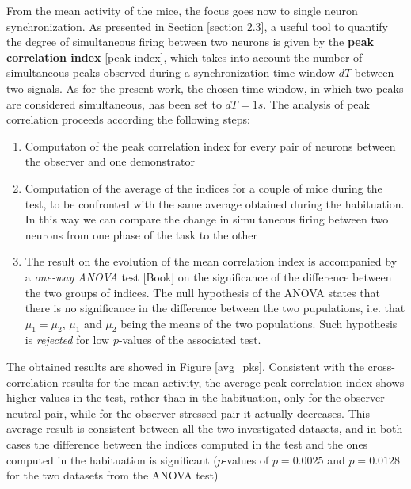 \documentclass[12pt, a4paper]{article}
\begin{document}
From the mean activity of the mice, the focus goes now to single neuron synchronization. As presented in Section \ref{section 2.3}, a useful tool to quantify the degree of simultaneous firing between two neurons is given by the \textbf{peak correlation index} \ref{peak index}, which takes into account the number of simultaneous peaks observed during a synchronization time window $dT$ between two signals. As for the present work, the chosen time window, in which two peaks are considered simultaneous, has been set to $dT = 1 s$. The analysis of peak correlation proceeds according the following steps:

\begin{enumerate}
	
	\item Computaton of the peak correlation index for every pair of neurons between the observer and one demonstrator 
	
	\item Computation of the average of the indices for a couple of mice during the test, to be confronted with the same average obtained during the habituation. In this way we can compare the change in simultaneous firing between two neurons from one phase of the task to the other
	
	\item The result on the evolution of the mean correlation index is accompanied by a \textit{one-way ANOVA} test [Book] on the significance of the difference between the two groups of indices. The null hypothesis of the ANOVA states that there is no significance in the difference between the two pupulations, i.e. that $ \mu_1 = \mu_2$,  $\mu_1$  and $ \mu_2$ being the  means of the two populations. Such hypothesis is \textit{rejected} for low $p$-values of the associated test.
	
\end{enumerate}

The obtained results are showed in Figure \ref{avg_pks}. Consistent with the cross-correlation results for the mean activity, the average peak correlation index shows higher values in the test, rather than in the habituation, only for the observer-neutral pair, while for the observer-stressed pair it actually decreases. This average result is consistent between all the two investigated datasets, and in both cases the difference between the indices computed in the test and the ones computed in the habituation is significant ($p$-values of $p = 0.0025$ and $p = 0.0128$ for the two datasets from the ANOVA test)
\end{document}
